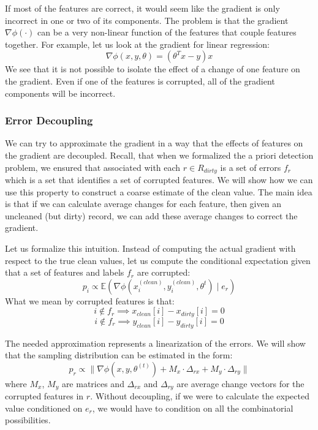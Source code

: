 If most of the features are correct, it would seem like the gradient is only
incorrect in one or two of its components.
The problem is that the gradient $\nabla\phi(\cdot)$ can be a very non-linear function of the features that couple features together.
For example, let us look at the gradient for linear regression:
\[
\nabla\phi(x,y,\theta) = (\theta^Tx - y)x
\]
We see that it is not possible to isolate the effect of a change of one feature on the gradient.
Even if one of the features is corrupted, all of the gradient components will be incorrect.

\subsubsection{Error Decoupling}
We can try to approximate the gradient in a way that the effects of features on the gradient are decoupled.
Recall, that when we formalized the a priori detection problem, we ensured that associated with each $r \in R_{dirty}$ is a set of errors $f_r$ which is a set that identifies a set of corrupted features.
We will show how we can use this property to construct a coarse estimate of the clean value.
The main idea is that if we can calculate average changes for each feature, then given an uncleaned (but dirty) record, we can add these average changes to correct the gradient.

Let us formalize this intuition.
Instead of computing the actual gradient with respect to the 
true clean values, let us compute the conditional expectation given that a set of features and labels $f_r$ are corrupted:
\[
p_i \propto \mathbb{E}(\nabla\phi(x^{(clean)}_i,y^{(clean)}_i,\theta^t) \mid e_r)
\]
What we mean by corrupted features is that:
\[
i \notin f_r \implies x_{clean}[i] - x_{dirty}[i] = 0
\]
\[
i \notin f_r \implies y_{clean}[i] - y_{dirty}[i] = 0
\]

The needed approximation represents a linearization of the errors.
We will show that the sampling distribution can be estimated in the form:
\[
p_{r}\propto\|\nabla\phi(x,y,\theta^{(t)}) + M_x \cdot \Delta_{rx} +  M_y \cdot \Delta_{ry}\|
\]
where $M_x$, $M_y$ are matrices and $\Delta_{rx}$ and $\Delta_{ry}$ are average change vectors for the corrupted features in $r$. 
Without decoupling, if we were to calculate the expected value conditioned on $e_r$, we would have to condition on all the combinatorial possibilities.

